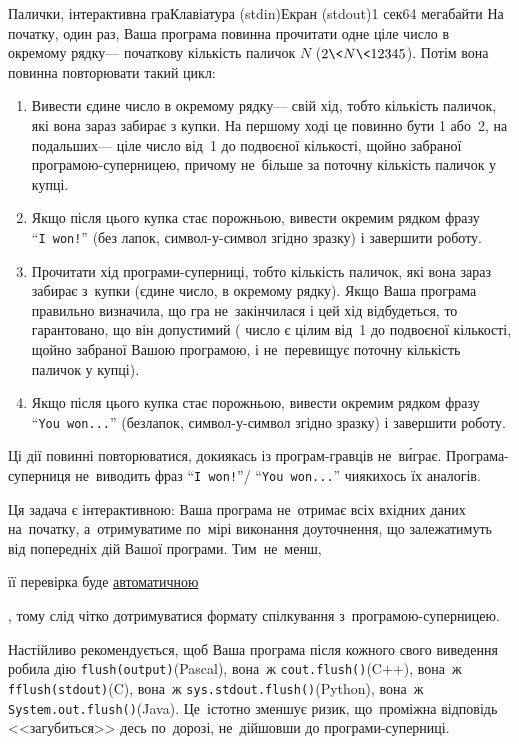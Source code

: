 \begin{problem}{Палички, інтерактивна гра}{Клавіатура (stdin)}{Екран (stdout)}{1 сек}{64 мегабайти}
На початку, один раз, Ваша програма повинна прочитати одне ціле число в окремому рядку\nolinebreak[3] --- початкову кількість паличок $N$ ($2{\<}N{\<}12345$).
Потім вона повинна повторювати такий цикл:
\begin{enumerate}
\item{}
Вивести єдине число в окремому рядку\nolinebreak[3] --- свій хід, тобто кількість паличок, які вона зараз забирає з купки.
На першому ході це повинно бути 1 або~2, на подальших\nolinebreak[2] --- ціле число від~1 до подвоєної кількості, щойно забраної про\-гра\-мою-суперницею, причому не~більше за поточну кількість паличок у купці. 
\item
Якщо після цього купка стає порожньою, 
вивести окремим рядком фразу ``\texttt{I~won!}''
(без лапок, символ-у-символ згідно зразку) і завершити роботу.
\item
Прочитати хід програми-суперниці, тобто кількість паличок, які вона зараз забирає з~купки (єдине %
число, в окремому рядку).
Якщо Ваша програма правильно визначила, що гра %
не~закінчилася і цей хід %
відбудеться, то гарантовано, що він допустимий (%
число є цілим від~1 до подвоєної кількості, щойно забраної Вашою програмою, і не~перевищує поточну кількість паличок у купці).
\item
Якщо після цього купка стає порожньою, 
вивести окремим рядком 
фразу ``\texttt{You~won...}''
(без\nolinebreak[3] лапок, символ-у-символ згідно зразку) і завершити роботу.
\end{enumerate}
Ці дії повинні повторюватися, 
доки\nolinebreak[3] якась із програм-гравців не~в\'{и}грає.
Програма-суперниця не~виводить фраз ``\texttt{I~won!}''\nolinebreak[2] / ``\texttt{You~won...}'' 
чи\nolinebreak[2] якихось їх аналогів.

Ця задача є інтерактивною: 
Ваша програма не~отримає всіх вхідних даних на~початку,
а~отримуватиме по~мірі виконання доуточнення, 
що залежатимуть від попередніх дій Вашої програми. 
Тим~не~менш, \begin{slshape}її перевірка буде
\underline{автоматичною}\end{slshape},
тому слід чітко дотримуватися формату спілкування з~програмою-суперницею.

Настійливо рекомендується, щоб Ваша програма після кожного свого виведення 
робила дію \verb"flush(output)"\nolinebreak[2] (Pascal), 
вона~ж \verb"cout.flush()"\nolinebreak[2] (C++), 
вона~ж \verb"fflush(stdout)"\nolinebreak[2] (C), 
вона~ж \verb"sys.stdout.flush()"\nolinebreak[2] (Python),
вона~ж \verb"System.out.flush()"\nolinebreak[2] (Java).
Це~істотно зменшує ризик, 
що~проміжна відповідь <<загубиться>> десь по~дорозі, 
не~дійшовши до програми-суперниці.


\end{problem}
